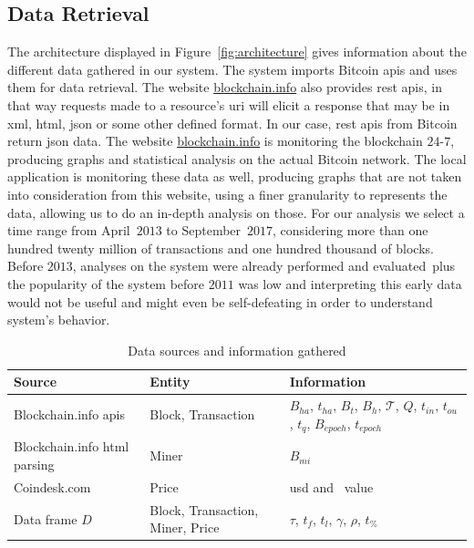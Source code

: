 \documentclass[USenglish]{uit-thesis}
\def\bitcoinA{%
	\leavevmode
	\vtop{\offinterlineskip %
		\setbox0=\hbox{B}%
		\setbox2=\hbox to\wd0{\hfil\hskip-.03em
			\vrule height .3ex width .15ex\hskip .08em
			\vrule height .3ex width .15ex\hfil}
		\vbox{\copy2\box0}\box2}}
\begin{document}
\subsection{Data Retrieval}
\label{sec:dataretrieval}
The architecture displayed in Figure~\ref{fig:architecture}
gives information about the different data
gathered in our system.
The system imports Bitcoin \gls{api}s and uses
them for data retrieval. The website \url{blockchain.info}
also provides \gls{rest} \gls{api}s, in that way
requests made to a resource's \gls{uri}
will elicit a response that may be in \gls{xml}, \gls{html}, \gls{json}
or some other defined format. In our case, \gls{rest} \gls{api}s
from Bitcoin return \gls{json} data.
The website \url{blockchain.info} is monitoring
the blockchain $24$-$7$,
producing graphs and
statistical analysis on the
actual Bitcoin network. The local
application is monitoring these data as well,
producing graphs that are not taken into
consideration from this website,
using a finer granularity to represents
the data, allowing us to
do an in-depth analysis on those.
For our analysis we select a time range from April~$2013$ to
September~$2017$, considering more than one hundred
twenty million of transactions
and one hundred thousand of blocks. Before $2013$, analyses
on the system were already performed and
evaluated\,\cite{croman2016, houy2014EOBTF,
	Moser2015, Rizun:2015:blocksizelimit}
plus the popularity of the system before
$2011$ was low and interpreting this early data would
not be useful and might even be self-defeating in order
to understand system's behavior.
\begin{table}
	\centering
		\caption{Data sources and information gathered}
		\label{tab:datasources}
	\begin{tabular}{|p{3cm}p{3cm}p{4cm}|} \hline
			\textbf{Source}&\textbf{Entity}& \textbf{Information}\\
			\hline
			Blockchain.info \gls{api}s&Block, Transaction&$B_{ha}$, $t_{ha}$, $B_t$, $B_h$, $\mathcal{T}$, $Q$, $t_{in}$, $t_{ou}$, $t_q$, $B_{epoch}$, $t_{epoch}$\\
			\hline
			Blockchain.info \gls{html} parsing&Miner& $B_{mi}$\\
			\hline
			Coindesk.com&Price&\gls{usd} and \bitcoinA~value\\
			\hline
			Data frame $D$&Block, Transaction, Miner, Price&$\tau$, $t_f$, $t_l$, $\gamma$, $\rho$, $t_\%$\\
			\hline
		\end{tabular}
\end{table}
\end{document}
